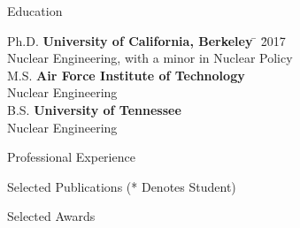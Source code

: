 \documentclass{resume3} %
\begin{document}

\begin{rSection}{Education}

\begin{tabbing}
Ph.D. \hspace*{2 em}\= \textbf{University of California, Berkeley} \hspace*{5em} \= \hspace*{15em} \= 2017 \\
      \> Nuclear Engineering, with a minor in Nuclear Policy \\
%
M.S. \hspace*{2 em}\> \textbf{Air Force Institute of Technology} \>  \\
      \> Nuclear Engineering\\
%
B.S. \hspace*{2 em}\> \textbf{University of Tennessee} \>  \\
      \> Nuclear Engineering
\end{tabbing}
\end{rSection}

\begin{rSection}{Professional Experience}

\end{rSection}

\begin{rSection}{Selected Publications (* Denotes Student)}

\end{rSection}

\vspace*{0.5em}
\begin{rSection}{Selected Awards}

\end{rSection}

\vspace*{0.5em}
%

\end{document}
